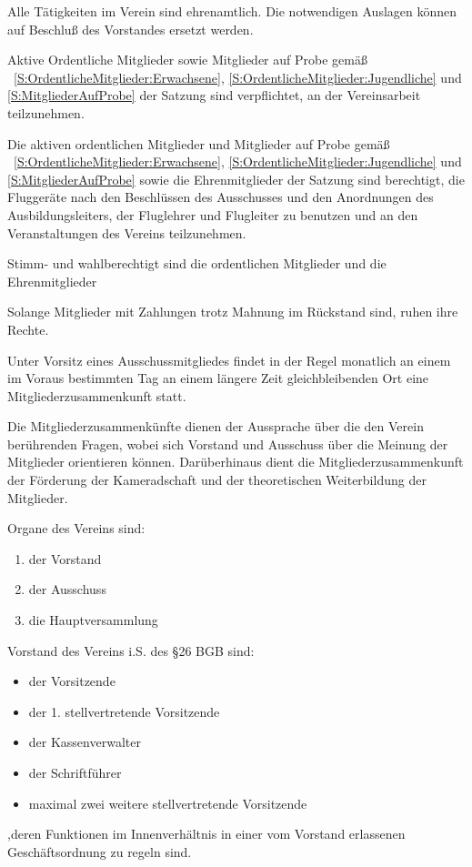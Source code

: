 \documentclass[10pt,a4paper,parskip=half]{scrartcl}
\begin{document}
\begin{contract}
    Alle Tätigkeiten im Verein sind ehrenamtlich.
    Die notwendigen Auslagen können auf Beschluß des Vorstandes ersetzt werden.
    
    Aktive Ordentliche Mitglieder sowie Mitglieder auf Probe gemäß ~\autoref{S:OrdentlicheMitglieder:Erwachsene}, \autoref{S:OrdentlicheMitglieder:Jugendliche} und \autoref{S:MitgliederAufProbe} der Satzung sind verpflichtet,
    an der Vereinsarbeit teilzunehmen.
    
    
    Die aktiven ordentlichen Mitglieder und Mitglieder auf Probe gemäß ~\autoref{S:OrdentlicheMitglieder:Erwachsene}, \autoref{S:OrdentlicheMitglieder:Jugendliche} und \autoref{S:MitgliederAufProbe} 
    sowie die Ehrenmitglieder der Satzung sind berechtigt,
    die Fluggeräte nach den Beschlüssen des Ausschusses und den Anordnungen des Ausbildungsleiters,
    der Fluglehrer und Flugleiter zu benutzen und an den Veranstaltungen des Vereins teilzunehmen.
    
    Stimm- und wahlberechtigt sind die ordentlichen Mitglieder und die Ehrenmitglieder
    
    Solange Mitglieder mit Zahlungen trotz Mahnung im Rückstand sind,
    ruhen ihre Rechte.
    
    Unter Vorsitz eines Ausschussmitgliedes findet in der Regel monatlich an einem im Voraus bestimmten Tag an einem längere Zeit gleichbleibenden Ort eine Mitgliederzusammenkunft statt.
    
    Die Mitgliederzusammenkünfte dienen der Aussprache über die den Verein berührenden Fragen,
    wobei sich Vorstand und Ausschuss über die Meinung der Mitglieder orientieren können.
    Darüberhinaus dient die Mitgliederzusammenkunft der Förderung der Kameradschaft und der theoretischen Weiterbildung der Mitglieder.
    
    Organe des Vereins sind:
    \begin{enumerate}[noitemsep]
      \item der Vorstand
      \item der Ausschuss
      \item die Hauptversammlung
    \end{enumerate}
    
    \label{C:Vorstand}
    Vorstand des Vereins i.S. des §26 BGB sind:
    \begin{itemize}[noitemsep]
      \item der Vorsitzende
      \item der 1. stellvertretende Vorsitzende
      \item der Kassenverwalter
      \item der Schriftführer
      \item maximal zwei weitere stellvertretende Vorsitzende
    \end{itemize}\label{S:Vorstandsmitglieder}
    ,deren Funktionen im Innenverhältnis in einer vom Vorstand erlassenen Geschäftsordnung zu regeln sind.
    

\end{contract}
\end{document}
